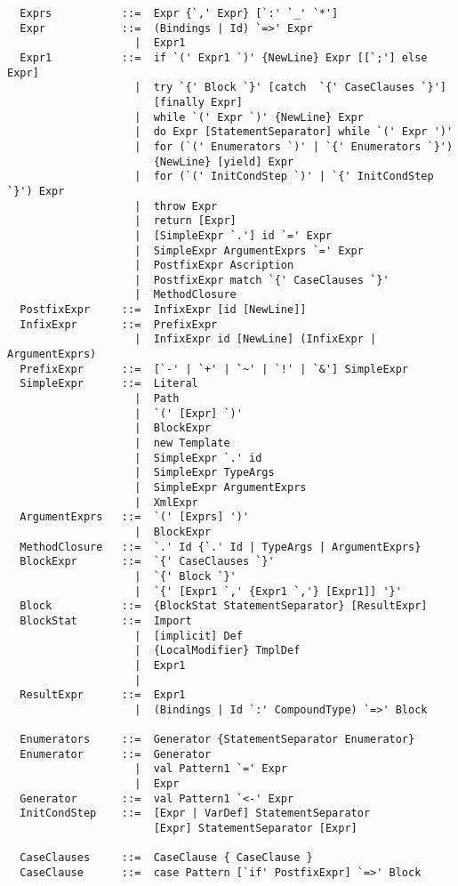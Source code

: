 \begin{lstlisting}
  Exprs           ::=  Expr {`,' Expr} [`:' `_' `*']
  Expr            ::=  (Bindings | Id) `=>' Expr
                    |  Expr1
  Expr1           ::=  if `(' Expr1 `)' {NewLine} Expr [[`;'] else Expr]
                    |  try `{' Block `}' [catch  `{' CaseClauses `}'] 
                       [finally Expr]
                    |  while `(' Expr `)' {NewLine} Expr
                    |  do Expr [StatementSeparator] while `(' Expr ')'
                    |  for (`(' Enumerators `)' | `{' Enumerators `}') 
                       {NewLine} [yield] Expr
                    |  for (`(' InitCondStep `)' | `{' InitCondStep `}') Expr
                    |  throw Expr
                    |  return [Expr]
                    |  [SimpleExpr `.'] id `=' Expr
                    |  SimpleExpr ArgumentExprs `=' Expr
                    |  PostfixExpr Ascription
                    |  PostfixExpr match `{' CaseClauses `}'
                    |  MethodClosure
  PostfixExpr     ::=  InfixExpr [id [NewLine]]
  InfixExpr       ::=  PrefixExpr
                    |  InfixExpr id [NewLine] (InfixExpr | ArgumentExprs)
  PrefixExpr      ::=  [`-' | `+' | `~' | `!' | `&'] SimpleExpr 
  SimpleExpr      ::=  Literal
                    |  Path
                    |  `(' [Expr] `)'
                    |  BlockExpr
                    |  new Template 
                    |  SimpleExpr `.' id 
                    |  SimpleExpr TypeArgs
                    |  SimpleExpr ArgumentExprs
                    |  XmlExpr
  ArgumentExprs   ::=  `(' [Exprs] ')'
                    |  BlockExpr
  MethodClosure   ::=  `.' Id {`.' Id | TypeArgs | ArgumentExprs}
  BlockExpr       ::=  `{' CaseClauses `}'
                    |  `{' Block `}'
                    |  `{' [Expr1 `,' {Expr1 `,'} [Expr1]] '}'
  Block           ::=  {BlockStat StatementSeparator} [ResultExpr]
  BlockStat       ::=  Import
                    |  [implicit] Def
                    |  {LocalModifier} TmplDef
                    |  Expr1
                    |
  ResultExpr      ::=  Expr1
                    |  (Bindings | Id `:' CompoundType) `=>' Block

  Enumerators     ::=  Generator {StatementSeparator Enumerator}
  Enumerator      ::=  Generator
                    |  val Pattern1 `=' Expr
                    |  Expr
  Generator       ::=  val Pattern1 `<-' Expr
  InitCondStep    ::=  [Expr | VarDef] StatementSeparator 
                       [Expr] StatementSeparator [Expr]

  CaseClauses     ::=  CaseClause { CaseClause }
  CaseClause      ::=  case Pattern [`if' PostfixExpr] `=>' Block 


\end{lstlisting}
